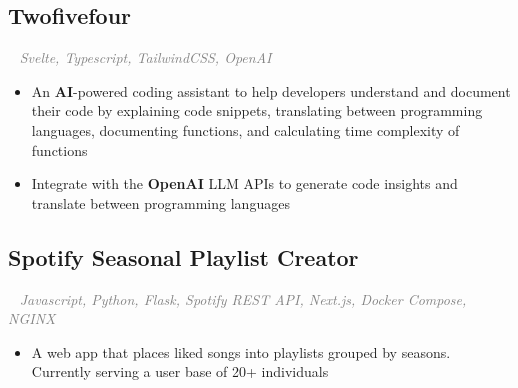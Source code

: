 \documentclass{article}
\newcommand{\projectsection}[3]{
    \subsection*{#1}
    \ 
    \small
    \textcolor{grey}{\emph{#2}}
    \normalsize
    \hfill
    \textcolor{black}{#3}
    \small
}
\begin{document}
\projectsection{Twofivefour}{Svelte, Typescript, TailwindCSS, OpenAI}{}
\begin{itemize}
    \item An \textbf{AI}-powered coding assistant to help developers understand and document their code by explaining code snippets, translating between programming languages, documenting functions, and calculating time complexity of functions
          \item Integrate with the \textbf{OpenAI} LLM APIs to generate code insights and translate between programming languages
\end{itemize}

\projectsection{Spotify Seasonal Playlist Creator}{Javascript, Python, Flask, Spotify REST API, Next.js, Docker Compose, NGINX}{}
\begin{itemize}
    \item A web app that places liked songs into playlists grouped by seasons. Currently serving a user base of 20+ individuals
\end{itemize}
\end{document}

